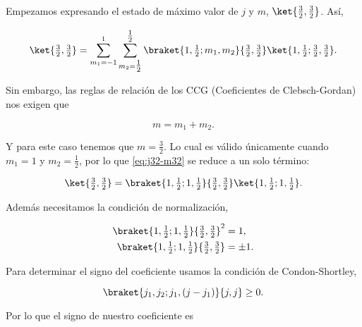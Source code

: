 \documentclass[./../main.tex]{subfiles}
\begin{document}
\begin{exercise}
\begin{enumerate}[label=(\alph*)]
\begin{solution}
                Empezamos expresando el estado de máximo valor de \(j\) y \(m\), \(\ket{\frac{3}{2},\frac{3}{2}}\). Así,

                \begin{equation}
                    \ket{\tfrac{3}{2}, \tfrac{3}{2}} = \sum_{m_{1} = -1}^{1}\sum_{m_{2} = \tfrac{1}{2}}^{\tfrac{1}{2}}\braket{1, \tfrac{1}{2}; m_{1}, m_{2}}{\tfrac{3}{2}, \tfrac{3}{2}}\ket{1, \tfrac{1}{2}; \tfrac{3}{2}, \tfrac{3}{2}}.
                    \label{eq:j32-m32}
                \end{equation}

                Sin embargo, las reglas de relación de los CCG (Coeficientes de Clebsch-Gordan) nos exigen que

                \begin{equation*}
                    m = m_{1} + m_{2}.
                \end{equation*}

                Y para este caso tenemos que \(m = \frac{3}{2}\). Lo cual es válido únicamente cuando \(m_{1} = 1\) y \(m_{2} = \frac{1}{2}\), por lo que \cref{eq:j32-m32} se reduce a un solo término:

                \begin{equation*}
                    \ket{\tfrac{3}{2}, \tfrac{3}{2}} = \braket{1, \tfrac{1}{2}; 1, \tfrac{1}{2}}{\tfrac{3}{2}, \tfrac{3}{2}}\ket{1, \tfrac{1}{2}; 1, \tfrac{1}{2}}.
                \end{equation*}

                Además necesitamos la condición de normalización,

                \begin{align*}
                    \braket{1, \tfrac{1}{2}; 1, \tfrac{1}{2}}{\tfrac{3}{2}, \tfrac{3}{2}}^{2} &= 1,\\
                    \braket{1, \tfrac{1}{2}; 1, \tfrac{1}{2}}{\tfrac{3}{2}, \tfrac{3}{2}} &= \pm 1.
                \end{align*}

                Para determinar el signo del coeficiente usamos la condición de Condon-Shortley,

                \begin{equation*}
                    \braket{j_{1}, j_{2}; j_{1}, (j - j_{1})}{j, j} \geq 0.
                \end{equation*}

                Por lo que el signo de nuestro coeficiente es


\end{solution}
\end{enumerate}
\end{exercise}
\end{document}
